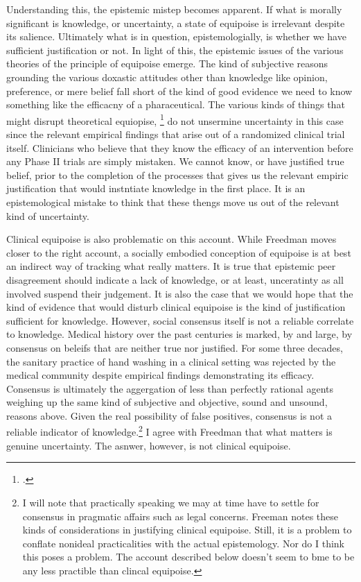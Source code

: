 \documentclass[letterpaper,notitlepage,12pt]{article}
\begin{document}
Understanding this, the epistemic mistep becomes apparent.
If what is morally significant is knowledge, or uncertainty, a state of
equipoise is irrelevant despite its salience.
Ultimately what is in question, epistemologially, is whether we have sufficient
justification or not.
In light of this, the epistemic issues of the various theories of the principle
of equipoise emerge.
The kind of subjective reasons grounding the various doxastic attitudes other
than knowledge like opinion, preference, or mere belief fall short of the kind
of good evidence we need to know something like the efficacny of a
pharaceutical.
The various kinds of things that might disrupt theoretical equiopise,
\footcite[p. 429]{freedman_equipoise_1987} do not unsermine
uncertainty in this case since the relevant empirical findings that arise out of
a randomized clinical trial itself.
Clinicians who believe that they know the efficacy of an intervention before any
Phase II trials are simply mistaken.
We cannot know, or have justified true belief, prior to the completion of the
processes that gives us the relevant empiric justification that would instntiate
knowledge in the first place.
It is an epistemological mistake to think that these thengs move us out of the
relevant kind of uncertainty.

Clinical equipoise is also problematic on this account.
While Freedman moves closer to the right account, a socially embodied conception
of equipoise is at best an indirect way of tracking what really matters.
It is true that epistemic peer disagreement should indicate a lack of knowledge,
or at least, unceratinty as all involved suspend their judgement.
It is also the case that we would hope that the kind of evidence that would
disturb clinical equipoise is the kind of justification sufficient for
knowledge.
However, social consensus itself is not a reliable correlate to knowledge.
Medical history over the past centuries is marked, by and large, by consensus on
beleifs that are neither true nor justified.
For some three decades, the sanitary practice of hand washing in a clinical
setting was rejected by the medical community despite empirical findings
demonstrating its efficacy.
Consensus is ultimately the aggergation of less than perfectly rational agents
weighing up the same kind of subjective and objective, sound and unsound,
reasons above.
Given the real possibility of false positives, consensus is not a reliable
indicator of knowledge.\footnote{I will note that practically speaking we may at
  time have to settle for consensus in pragmatic affairs such as legal concerns.
  Freeman notes these kinds of considerations in justifying clinical equipoise.
  Still, it is a problem to conflate nonideal practicalities with the actual
  epistemology. Nor do I think this poses a problem. The account described below
doesn't seem to bme to be any less practible than clincal equipoise.}
I agree with Freedman that what matters is genuine uncertainty.
The asnwer, however, is not clinical equipoise.
\end{document}

